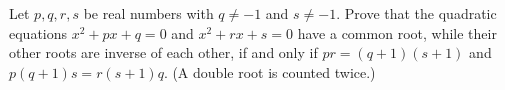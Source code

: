 Let $p,q, r, s$ be real numbers with $q \ne -1$ and $s \ne -1$. Prove that the quadratic equations $x^2 + px+q = 0$ and $x^2 +rx+s = 0$ have a common root, while their other roots are inverse of each other, if and only if $pr = (q+1)(s+1)$ and $p(q+1)s = r(s+1)q$.
(A double root is counted twice.)